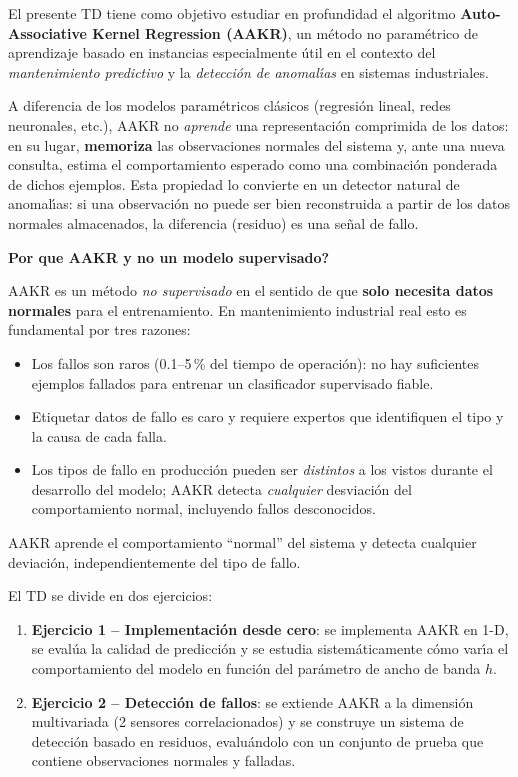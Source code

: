 \documentclass[12pt,a4paper]{article}
\newcommand{\porque}[2]{%
  \vspace{8pt}%
  \begin{mdframed}[backgroundcolor=porqueFondo,
                   linecolor=porqueBorde,
                   linewidth=1.5pt,
                   leftmargin=0pt,
                   rightmargin=0pt,
                   innerleftmargin=10pt,
                   innerrightmargin=10pt,
                   innertopmargin=6pt,
                   innerbottommargin=6pt]
    {\color{porqueBorde}\bfseries\small Por que #1}\\[3pt]
    {\small #2}
  \end{mdframed}%
  \vspace{8pt}%
}
\begin{document}
El presente TD tiene como objetivo estudiar en profundidad el algoritmo
\textbf{Auto-Associative Kernel Regression (AAKR)}, un m\'etodo no param\'etrico de
aprendizaje basado en instancias especialmente \'util en el contexto del
\emph{mantenimiento predictivo} y la \emph{detecci\'on de anomal\'{\i}as} en sistemas
industriales.

A diferencia de los modelos param\'etricos cl\'asicos (regresi\'on lineal, redes
neuronales, etc.), AAKR no \emph{aprende} una representaci\'on comprimida de los
datos: en su lugar, \textbf{memoriza} las observaciones normales del sistema y,
ante una nueva consulta, estima el comportamiento esperado como una combinaci\'on
ponderada de dichos ejemplos. Esta propiedad lo convierte en un detector natural de
anomal\'{\i}as: si una observaci\'on no puede ser bien reconstruida a partir de los datos
normales almacenados, la diferencia (residuo) es una se\~nal de fallo.

\porque{AAKR y no un modelo supervisado?}{%
AAKR es un m\'etodo \emph{no supervisado} en el sentido de que \textbf{solo necesita
datos normales} para el entrenamiento. En mantenimiento industrial real esto es
fundamental por tres razones:
\begin{itemize}[leftmargin=1.5em,noitemsep]
  \item Los fallos son raros (0.1--5\,\% del tiempo de operaci\'on): no hay
        suficientes ejemplos fallados para entrenar un clasificador supervisado fiable.
  \item Etiquetar datos de fallo es caro y requiere expertos que identifiquen
        el tipo y la causa de cada falla.
  \item Los tipos de fallo en producci\'on pueden ser \emph{distintos} a los vistos
        durante el desarrollo del modelo; AAKR detecta \emph{cualquier} desviaci\'on
        del comportamiento normal, incluyendo fallos desconocidos.
\end{itemize}
AAKR aprende el comportamiento ``normal'' del sistema y detecta cualquier deviaci\'on,
independientemente del tipo de fallo.}

El TD se divide en dos ejercicios:

\begin{enumerate}[leftmargin=2em]
  \item \textbf{Ejercicio 1 -- Implementaci\'on desde cero}: se implementa AAKR en
        1-D, se eval\'ua la calidad de predicci\'on y se estudia sistem\'aticamente c\'omo
        var\'{\i}a el comportamiento del modelo en funci\'on del par\'ametro de ancho de
        banda $h$.
  \item \textbf{Ejercicio 2 -- Detecci\'on de fallos}: se extiende AAKR a la
        dimensi\'on multivariada (2 sensores correlacionados) y se construye un
        sistema de detecci\'on basado en residuos, evalu\'andolo con un conjunto de
        prueba que contiene observaciones normales y falladas.
\end{enumerate}
\end{document}
